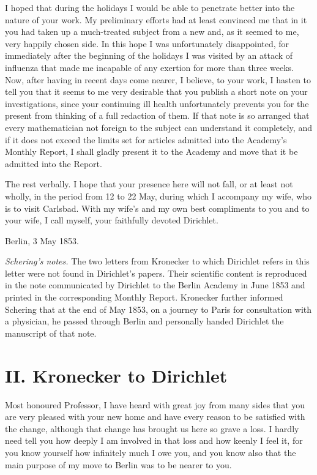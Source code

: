 \documentclass[11pt]{article}
\begin{document}
I hoped that during the holidays I would be able to penetrate better into the nature of your work. My preliminary efforts had at least convinced me that in it you had taken up a much-treated subject from a new and, as it seemed to me, very happily chosen side. In this hope I was unfortunately disappointed, for immediately after the beginning of the holidays I was visited by an attack of influenza that made me incapable of any exertion for more than three weeks. Now, after having in recent days come nearer, I believe, to your work, I hasten to tell you that it seems to me very desirable that you publish a short note on your investigations, since your continuing ill health unfortunately prevents you for the present from thinking of a full redaction of them. If that note is so arranged that every mathematician not foreign to the subject can understand it completely, and if it does not exceed the limits set for articles admitted into the Academy's Monthly Report, I shall gladly present it to the Academy and move that it be admitted into the Report.

The rest verbally. I hope that your presence here will not fall, or at least not wholly, in the period from 12 to 22 May, during which I accompany my wife, who is to visit Carlsbad. With my wife's and my own best compliments to you and to your wife, I call myself, your faithfully devoted Dirichlet.

Berlin, 3 May 1853.

\medskip
\noindent\emph{Schering's notes.} The two letters from Kronecker to which Dirichlet refers in this letter were not found in Dirichlet's papers. Their scientific content is reproduced in the note communicated by Dirichlet to the Berlin Academy in June 1853 and printed in the corresponding Monthly Report. Kronecker further informed Schering that at the end of May 1853, on a journey to Paris for consultation with a physician, he passed through Berlin and personally handed Dirichlet the manuscript of that note.

\section*{II. Kronecker to Dirichlet}
Most honoured Professor, I have heard with great joy from many sides that you are very pleased with your new home and have every reason to be satisfied with the change, although that change has brought us here so grave a loss. I hardly need tell you how deeply I am involved in that loss and how keenly I feel it, for you know yourself how infinitely much I owe you, and you know also that the main purpose of my move to Berlin was to be nearer to you.
\end{document}
